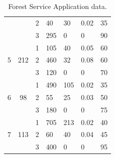 \documentclass[a4paper,10 pt,titlepage,twoside]{book}
\theoremstyle{plain}
\theoremstyle{definition}
\theoremstyle{remark}
\begin{document}
\begin{table}[]
\begin{tabular}{cccllll}
		&  & 2 & 40 & 30 & 0.02 & 35 \\
		&  & 3 & 295 & 0 & 0 & 90 \\ \hline
		\multirow{3}{*}{5} & \multirow{3}{*}{212} & 1 & 105 & 40 & 0.05 & 60 \\
		&  & 2 & 460 & 32 & 0.08 & 60 \\
		&  & 3 & 120 & 0 & 0 & 70 \\ \hline
		\multirow{3}{*}{6} & \multirow{3}{*}{98} & 1 & 490 & 105 & 0.02 & 35 \\
		&  & 2 & 55 & 25 & 0.03 & 50 \\
		&  & 3 & 180 & 0 & 0 & 75 \\ \hline
		\multirow{3}{*}{7} & \multirow{3}{*}{113} & 1 & 705 & 213 & 0.02 & 40 \\
		&  & 2 & 60 & 40 & 0.04 & 45 \\
		&  & 3 & 400 & 0 & 0 & 95 \\ \hline
	\end{tabular}\caption{\label{table:timber}Forest Service Application data.}
\end{table}
\end{document}
